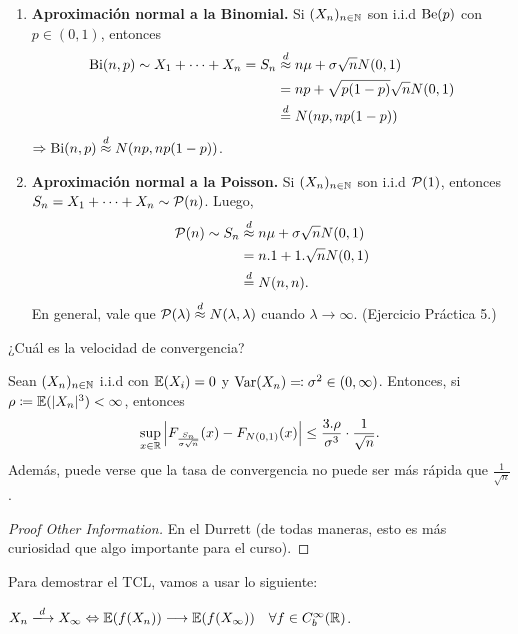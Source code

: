 \begin{enumerate}
	\item \textbf{Aproximación normal a la Binomial.} Si $(X_{n})_{n \in \mathbb{N}}$ son i.i.d $\operatorname{Be}(p)$ con $p \in (0,1)$, entonces 
	\begin{align*}
		\operatorname{Bi}(n,p) \sim X_{1} + \cdots + X_{n} = S_{n} &\stackrel{d}{\approx} n\mu + \sigma \sqrt{n} N(0,1) \\
		&= np + \sqrt{p(1 - p)} \sqrt{n} N(0,1) \\
		&\stackrel{d}{=} N(np, np(1 - p)) 
	\end{align*}
	$\Rightarrow \operatorname{Bi}(n,p) \stackrel{d}{\approx} N(np, np(1 - p))$.

	\item \textbf{Aproximación normal a la Poisson.} Si $(X_{n})_{n \in \mathbb{N}}$ son i.i.d $\mathcal{P}(1)$, entonces $S_{n} = X_{1} + \cdots + X_{n} \sim \mathcal{P}(n)$. Luego, 
	\begin{align*}
		\mathcal{P}(n) \sim S_{n} &\stackrel{d}{\approx} n\mu + \sigma \sqrt{n} N(0,1) \\
		&= n . 1 + 1 . \sqrt{n} N(0,1) \\
		&\stackrel{d}{=} N(n,n)
	.\end{align*}
	En general, vale que $\mathcal{P}(\lambda) \stackrel{d}{\approx} N(\lambda,\lambda)$ cuando $\lambda \longrightarrow \infty$. (Ejercicio Práctica 5.)
\end{enumerate}

\begin{pregunta}
	¿Cuál es la velocidad de convergencia?
\end{pregunta}

\begin{theorem}
	Sean $(X_{n})_{n \in \mathbb{N}}$ i.i.d con $\mathbb{E}(X_{i}) = 0$ y $\operatorname{Var}(X_{n}) \eqcolon \sigma^{2} \in (0,\infty)$. Entonces, si $\rho \coloneq \mathbb{E}(|X_{n}|^{3}) < \infty$, entonces
	\[ \sup_{x \in \mathbb{R}} \left| F_{\frac{S_{n}}{\sigma \sqrt{n}}}(x) - F_{N(0,1)}(x) \right| \leq \frac{3 . \rho}{\sigma^{3}} \cdot \frac{1}{\sqrt{n}}. \]
	Además, puede verse que la tasa de convergencia no puede ser más rápida que $\frac{1}{\sqrt{n}}$.
\end{theorem}
\begin{proof}[Proof Other Information]
	En el Durrett (de todas maneras, esto es más curiosidad que algo importante para el curso).
\end{proof}

Para demostrar el TCL, vamos a usar lo siguiente:

\begin{prop}
	$X_{n} \xlongrightarrow{d} X_{\infty} \iff \mbb{E}(f(X_{n})) \longrightarrow \mbb{E}(f(X_{\infty})) \quad \forall f \in C_{b}^{\infty}(\R)$.
\end{prop}


